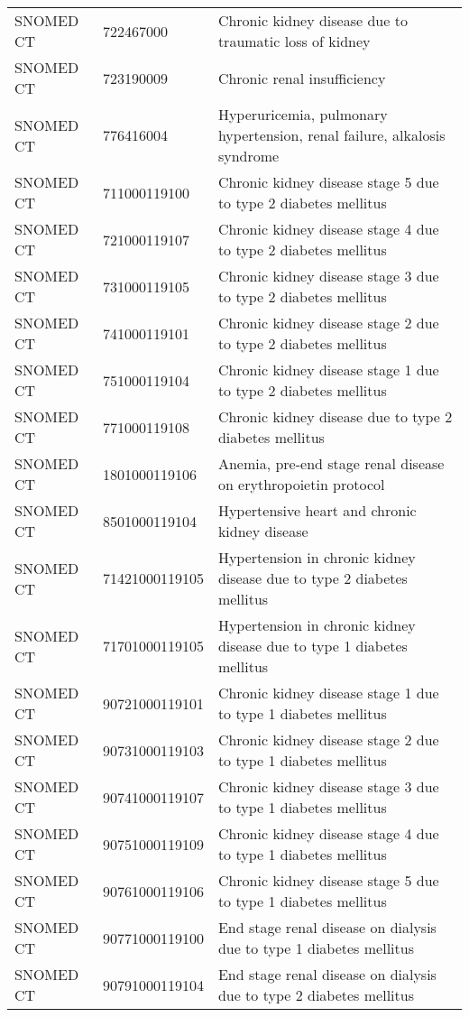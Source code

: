 \begin{longtable}{p{}p{}p{}}
  SNOMED CT & 722467000 & Chronic kidney disease due to traumatic loss of kidney \\ 
  SNOMED CT & 723190009 & Chronic renal insufficiency \\ 
  SNOMED CT & 776416004 & Hyperuricemia, pulmonary hypertension, renal failure, alkalosis syndrome \\ 
  SNOMED CT & 711000119100 & Chronic kidney disease stage 5 due to type 2 diabetes mellitus \\ 
  SNOMED CT & 721000119107 & Chronic kidney disease stage 4 due to type 2 diabetes mellitus \\ 
  SNOMED CT & 731000119105 & Chronic kidney disease stage 3 due to type 2 diabetes mellitus \\ 
  SNOMED CT & 741000119101 & Chronic kidney disease stage 2 due to type 2 diabetes mellitus \\ 
  SNOMED CT & 751000119104 & Chronic kidney disease stage 1 due to type 2 diabetes mellitus \\ 
  SNOMED CT & 771000119108 & Chronic kidney disease due to type 2 diabetes mellitus \\ 
  SNOMED CT & 1801000119106 & Anemia, pre-end stage renal disease on erythropoietin protocol \\ 
  SNOMED CT & 8501000119104 & Hypertensive heart and chronic kidney disease \\ 
  SNOMED CT & 71421000119105 & Hypertension in chronic kidney disease due to type 2 diabetes mellitus \\ 
  SNOMED CT & 71701000119105 & Hypertension in chronic kidney disease due to type 1 diabetes mellitus \\ 
  SNOMED CT & 90721000119101 & Chronic kidney disease stage 1 due to type 1 diabetes mellitus \\ 
  SNOMED CT & 90731000119103 & Chronic kidney disease stage 2 due to type 1 diabetes mellitus \\ 
  SNOMED CT & 90741000119107 & Chronic kidney disease stage 3 due to type 1 diabetes mellitus \\ 
  SNOMED CT & 90751000119109 & Chronic kidney disease stage 4 due to type 1 diabetes mellitus \\ 
  SNOMED CT & 90761000119106 & Chronic kidney disease stage 5 due to type 1 diabetes mellitus \\ 
  SNOMED CT & 90771000119100 & End stage renal disease on dialysis due to type 1 diabetes mellitus \\ 
  SNOMED CT & 90791000119104 & End stage renal disease on dialysis due to type 2 diabetes mellitus \\ 

\end{longtable}
